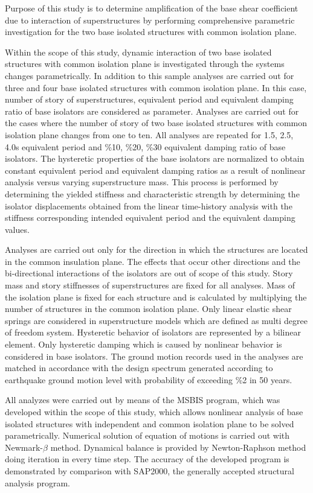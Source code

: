 Purpose of this study is to determine amplification of the base shear
coefficient due to interaction of superstructures by performing comprehensive
parametric investigation for the two base isolated structures with
common isolation plane.

Within the scope of this study, dynamic interaction of two base isolated
structures with common isolation plane is investigated through the
systems changes parametrically. In addition to this sample analyses
are carried out for three and four base isolated structures with common
isolation plane. In this case, number of story of superstructures,
equivalent period and equivalent damping ratio of base isolators are
considered as parameter. Analyses are carried out for the cases where
the number of story of two base isolated structures with common isolation
plane changes from one to ten. All analyses are repeated for 1.5,
2.5, 4.0s equivalent period and \%10, \%20, \%30 equivalent damping
ratio of base isolators. The hysteretic properties of the base isolators
are normalized to obtain constant equivalent period and equivalent
damping ratios as a result of nonlinear analysis versus varying superstructure
mass. This process is performed by determining the yielded stiffness
and characteristic strength by determining the isolator displacements
obtained from the linear time-history analysis with the stiffness
corresponding intended equivalent period and the equivalent damping
values.

Analyses are carried out only for the direction in which the structures
are located in the common insulation plane. The effects that occur
other directions and the bi-directional interactions of the isolators
are out of scope of this study. Story mass and story stiffnesses of
superstructures are fixed for all analyses. Mass of the isolation
plane is fixed for each structure and is calculated by multiplying
the number of structures in the common isolation plane. Only linear
elastic shear springs are considered in superstructure models which
are defined as multi degree of freedom system. Hysteretic behavior
of isolators are represented by a bilinear element. Only hysteretic
damping which is caused by nonlinear behavior is considered in base
isolators. The ground motion records used in the analyses are matched
in accordance with the design spectrum generated according to earthquake
ground motion level with probability of exceeding \%2 in 50 years.

All analyzes were carried out by means of the MSBIS program, which
was developed within the scope of this study, which allows nonlinear
analysis of base isolated structures with independent and common isolation
plane to be solved parametrically. Numerical solution of equation
of motions is carried out with Newmark-$\beta$ method. Dynamical
balance is provided by Newton-Raphson method doing iteration in every
time step. The accuracy of the developed program is demonstrated by
comparison with SAP2000, the generally accepted structural analysis
program.

